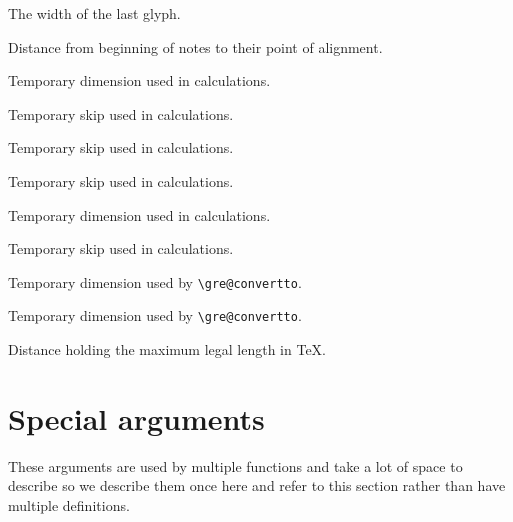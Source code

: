 The width of the last glyph.

Distance from beginning of notes to their point of alignment.

Temporary dimension used in calculations.

Temporary skip used in calculations.

Temporary skip used in calculations.

Temporary skip used in calculations.

Temporary dimension used in calculations.

Temporary skip used in calculations.

Temporary dimension used by \verb=\gre@convertto=.

Temporary dimension used by \verb=\gre@convertto=.

Distance holding the maximum legal length in TeX.



\section{Special arguments}

These arguments are used by multiple functions and take a lot of space
to describe so we describe them once here and refer to this section
rather than have multiple definitions.

